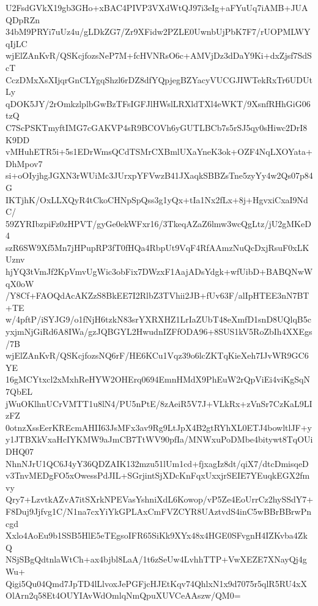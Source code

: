 U2FsdGVkX19gb3GHo+xBAC4PIVP3VXdWtQJ97i3eIg+aFYuUq7iAMB+JUAQDpRZn
34bM9PRYi7uUz4u/gLDkZG7/Zr9XFidw2PZLE0UwnbUjPbK7F7/rUOPMLWYqIjLC
wjElZAnKvR/QSKcjfozsNeP7M+fcHVNRsO6c+AMVjDz3dDaY9Ki+dxZjsf7SdScT
CczDMxXsXIjqrGnCLYgqShzl6rDZ8dfYQpjegBZYacyVUCGJIWTekRxTr6UDUtLy
qDOK5JY/2rOmkzlplbGwBzTFsIGFJlHWslLRXldTXl4eWKT/9XsnfRHhGiG06tzQ
C7ScPSKTmyftIMG7cGAKVP4sR9BCOVh6yGUTLBCb7s5rSJ5qy0sHiwc2DrI8K9DD
vMHuhETR5i+5s1EDrWmsQCdTSMrCXBmlUXaYneK3ok+OZF4NqLXOYata+DhMpov7
si+oOIyjhgJGXN3rWUiMc3JUrxpYFVwzB41JXaqkSBBZsTne5zyYy4w2Qs07p84G
IKTjhK/OxLLXQyR4tCkoCHNpSpQss3g1yQx+tIa1Nx2fLx+8j+HgvxiCxaI9NdC/
59ZYRIbzpiFz0zHPVT/gyGe0ekWFxr16/3TkeqAZaZ6lmw3wcQgLtz/jU2gMKeD4
szR6SW9Xf5Mn7jHPupRP3fT0fHQa4RbpUt9VqF4RfAAmzNuQcDxjRsuF0xLKUznv
hjYQ3tVmJf2KpVmvUgWic3obFix7DWzxF1AajADsYdgk+wfUibD+BABQNwWqX0oW
/Y8Cf+FAOQdAcAKZzS8BkEE7I2RlbZ3TVhii2JB+fUv63F/alIpHTEE3nN7BT+TE
w/4pftP/iSYJG9/o1fNjH6tzkN83srYXRXHZ1LrIaZUbT48eXmfD1snD8UQlqB5c
yxjmNjGiRd6A8IWa/gzJQBGYL2HwudnIZFfODA96+8SUS1kV5RoZbIh4XXEgs/7B
wjElZAnKvR/QSKcjfozsNQ6rF/HE6KCu1Vqz39o6lcZKTqKieXeh7IJvWR9GC6YE
16gMCYtxcl2xMxhReHYW2OHErq0694EmnHMdX9PhEuW2rQpViEi4viKgSqN7QbEL
jWuOKlhnUCrVMTT1u8lN4/PU5nPtE/8zAeiR5V7J+VLkRx+zVnSr7CzKaL9LIzFZ
0otnzXssEerKREcmAHII63JsMFx3av9Rg9LtJpX4B2gtRYhXL0ETJ4bowltlJF+y
y1JTBXkVxaHcIYKMW9aJmCB7TtWV90pfIa/MNWxuPoDMbe4bitywt8TqOUiDHQ07
NhnNJrU1QC6J4yY36QDZAIK132mzu51lUm1cd+fjxagIz8dt/qiX7/dtcDmisqeD
v3TnvMEDgFO5xOwessPdJIL+SGrjintSjXDcKnFqxUxxjrSEIE7YEuqkEGX2fmvy
Qry7+LzvtkAZvA7itSXrkNPEVasYshniXdL6Kowop/vP5Ze4EoUrrCz2hySSdY7+
F8Duj9Jjfvg1C/N1na7cxYiYkGPLAxCmFVZCYR8UAztvdS4inC5wBBrBBrwPncgd
Xxlo4AoEu9b1SSB5HlE5eTEgsoIFR65SiKk9XYx48x4HGE0SFvgnH4IZKvba4ZkQ
NSjSBgQdtnlaWtCh+ax4bjbl8LaA/1t6zSeUw4LvhhTTP+VwXEZE7XNayQj4gWu+
Qigi5Qu04Qmd7JpTD4lLlvoxJePGFjcHJEtKqv74QhlxN1x9d7075r5qlR5RU4xX
OlArn2q58Et4OUYIAvWdOmlqNmQpuXUVCeAAszw/QM0=
